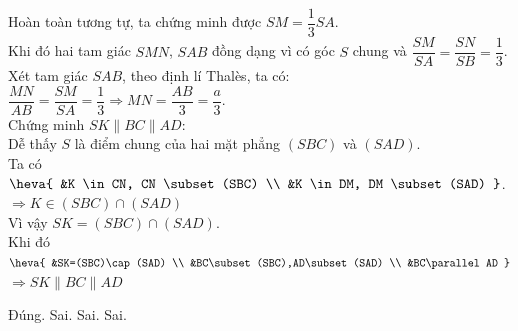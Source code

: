 \begin{ex}
{		 Hoàn toàn tương tự, ta chứng minh được $SM=\dfrac{1}{3} SA$.\\
		Khi đó hai tam giác $SMN$, $SAB$ đồng dạng vì có góc $S$ chung  và $\dfrac{SM}{SA} =\dfrac{SN}{SB}=\dfrac{1}{3}$.\\
		Xét tam giác $SAB$, theo định lí Thalès, ta  có:\\
		$\dfrac{MN}{AB}=\dfrac{SM}{SA} =\dfrac{1}{3} \Rightarrow MN=\dfrac{AB}{3}  =\dfrac{a}{3} $.\\
		Chứng minh $SK\parallel  BC\parallel AD$:\\
		Dễ thấy $S$  là điểm chung của hai mặt phẳng $(SBC)$ và $(SAD)$.\\
		 Ta có $\heva{
		&K \in  CN, CN \subset(SBC) \\
		&K \in DM, DM \subset(SAD) } $. $\Rightarrow K \in(S  B C) \cap(S A D)$\\
		Vì vậy $SK=(SBC)\cap(SAD)$.\\ 
		 Khi đó $\heva{
		 &SK=(SBC)\cap (SAD) \\
		 &BC\subset (SBC),AD\subset (SAD) \\
		&BC\parallel AD  }$ $\Rightarrow SK\parallel BC\parallel AD$
		\begin{itemchoice}
			\itemch  Đúng.
			\itemch  Sai.
			 \itemch Sai.
			 \itemch Sai.
		\end{itemchoice}
	} 
\end{ex}

